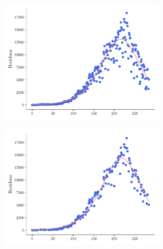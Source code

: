 \documentclass[twocolumn,aps,prl]{revtex4-1}
\begin{document}
\begin{figure}[ht!]
  \centering
  \begin{subfigure}[b]{0.49\linewidth}
      \centering
      \includegraphics[width = 0.9\textwidth]{figuras/ex02-fit.pdf}
      \caption{}
      \label{fig:figuras/ex02-fit}
  \end{subfigure}\quad
  \begin{subfigure}[b]{0.49\linewidth}
      \centering
      \includegraphics[width = 0.9\textwidth]{figuras/ex02-fit-sin-Finde.pdf}
      \caption{}
      \label{fig:figuras/ex02-fit-sin-Finde}
  \end{subfigure}\quad


\end{figure}
\end{document}
